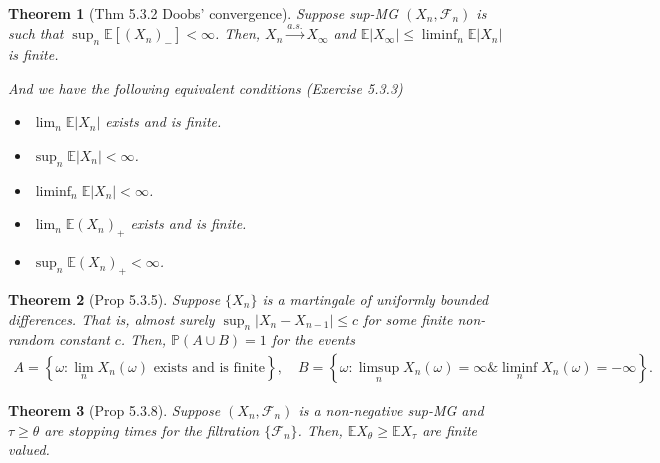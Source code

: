 \documentclass[11pt,a4paper]{article}
\numberwithin{equation}{section}%
\newtheorem{theorem}{Theorem}[]
\begin{document}
\begin{theorem}[Thm 5.3.2 Doobs' convergence]
    Suppose sup-MG $(X_n, \mathcal{F}_n)$ is such that $\sup_n \mathbb{E}[(X_n)_-] < \infty$. Then, $X_n \xrightarrow{a.s.} X_{\infty}$ and $\mathbb{E}|X_{\infty}| \leq \liminf_n \mathbb{E}|X_n|$ is finite.

    And we have the following equivalent conditions (Exercise 5.3.3)
    \begin{itemize}[topsep=0pt,itemsep=-8pt]
        \item $\lim_n \mathbb{E}|X_n|$ exists and is finite.
        \item $\sup_n \mathbb{E}|X_n| < \infty$.
        \item $\liminf_n \mathbb{E}|X_n| < \infty$.
        \item $\lim_n \mathbb{E}(X_n)_+$ exists and is finite.
        \item $\sup_n \mathbb{E}(X_n)_+ < \infty$.
    \end{itemize}
\end{theorem}

\begin{theorem}[Prop 5.3.5]
    Suppose $\{X_n\}$ is a martingale of uniformly bounded differences. That is, almost surely $\sup_n |X_n - X_{n-1}| \leq c$ for some finite non-random constant $c$. Then, $\mathbb{P}(A \cup B) = 1$ for the events
    \begin{align*}
        A = \left\{ \omega : \lim_n X_n(\omega) \text{ exists and is finite} \right\}, \quad B = \left\{ \omega : \limsup_n X_n(\omega) = \infty \& \liminf_n X_n(\omega) = -\infty \right\}. 
    \end{align*}
\end{theorem}

\begin{theorem}[Prop 5.3.8]
    Suppose $(X_n, \mathcal{F}_n)$ is a non-negative sup-MG and $\tau \geq \theta$ are stopping times for the filtration $\{\mathcal{F}_n\}$. Then, $\mathbb{E}X_{\theta} \geq \mathbb{E}X_{\tau}$ are finite valued.
\end{theorem}
\end{document}
